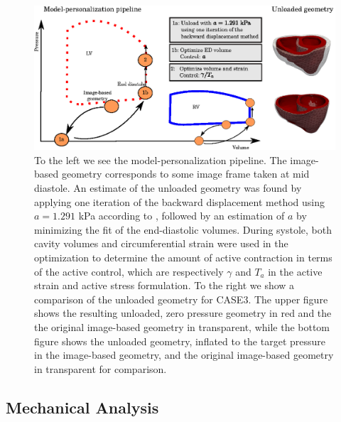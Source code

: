 \begin{figure}[htbp]
  \centering
  \includegraphics[width=\textwidth]{figures/models}
  \caption{\label{paper3:fig:pipeline}To the left we see the
    model-personalization pipeline. The image-based
    geometry corresponds to some image frame taken at mid diastole. An
    estimate of the unloaded geometry was found by applying one
    iteration of the backward displacement method using $a = 1.291$ kPa
    according to \citep{asner2015estimation}, followed by an estimation
    of $a$ by minimizing the fit of the end-diastolic volumes. During
    systole, both cavity volumes and circumferential strain were used in
    the optimization to determine the amount of active contraction in
    terms of the active control, which are respectively  $\gamma$ and $
    T_a$ in the active strain and active stress formulation. To the
    right we show a comparison of the unloaded geometry for CASE3. The
    upper figure shows the resulting unloaded, zero pressure geometry in
    red and the the original image-based geometry in transparent, while
    the bottom figure shows the unloaded geometry, inflated to the target
    pressure in the image-based geometry, and the original image-based
    geometry in transparent for comparison.}
\end{figure}

\subsection{Mechanical Analysis}

